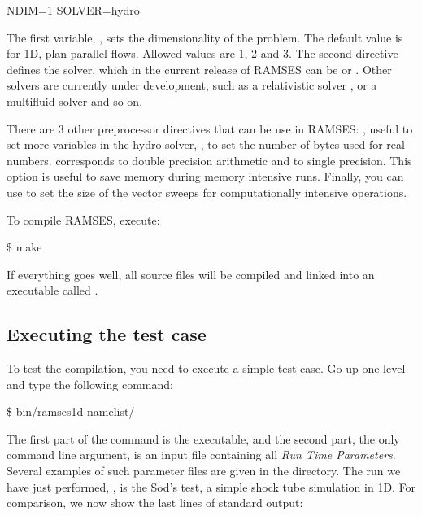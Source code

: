 \begin{Prompt}
NDIM=1
SOLVER=hydro
\end{Prompt}

The first variable, , sets the dimensionality of the
problem. The default value is for 1D, plan-parallel flows. Allowed
values are 1, 2 and 3. The second directive defines the solver, which in
the current release of RAMSES can be  or .
Other solvers are currently under development, such as a relativistic
solver , or a multifluid solver 
 and so on.

There are 3 other preprocessor directives that can be use in RAMSES:
, useful to set more variables in the
hydro solver, , to set the number of bytes used
for real numbers.  corresponds to double precision
arithmetic and  to single precision. This option is useful
to save memory during memory intensive runs. Finally, you can use
 to set the size of the vector sweeps for
computationally intensive operations.

To compile RAMSES, execute:

\begin{Prompt}
\$ make
\end{Prompt}

If everything goes well, all source files will be compiled and linked
into an executable called .

\subsection{Executing the test case}

To test the compilation, you need to execute a simple test case. Go up
one level and type the following command:

\begin{Prompt}
\$ bin/ramses1d namelist/{\nmlfilename}
\end{Prompt}

The first part of the command is the executable, and the second part, the only
command line argument, is an input file containing all \emph{Run Time
Parameters}. Several examples of such parameter files are given in the
 directory. The run we have just performed, \cmd{\nmlfilename},
is the Sod's test, a simple shock tube simulation in 1D. For comparison, we now
show the last {\lastlinescount} lines of standard output:

